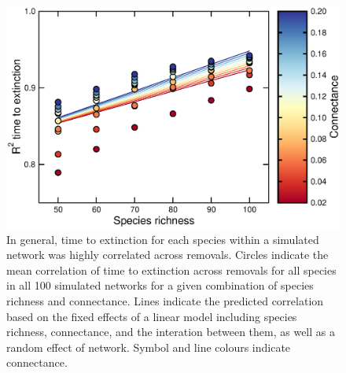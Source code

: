 \documentclass[12pt]{article}
\begin{document}
	\begin{figure}[h!]
		\caption{In general, time to extinction for each species within a simulated network was highly correlated across removals. Circles indicate the mean correlation of time to extinction across removals for all species in all 100 simulated networks for a given combination of species richness and connectance. Lines indicate the predicted correlation based on the fixed effects of a linear model including species richness, connectance, and the interation between them, as well as a random effect of network. Symbol and line colours indicate connectance.}
		\label{extorder_corrs}
		\includegraphics[width=\textwidth]{figures/extinction_order/extorder_correlations_paper_full.eps}
		\end{figure}
\end{document}

